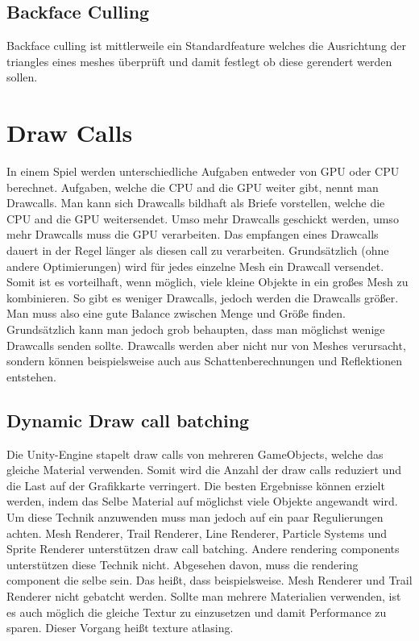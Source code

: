 \subsection{Backface Culling}
Backface culling ist mittlerweile ein Standardfeature welches die Ausrichtung der triangles eines meshes überprüft und damit festlegt ob diese gerendert werden sollen.
\cite{_cryengine_culling}

\section{Draw Calls}
In einem Spiel werden unterschiedliche Aufgaben entweder von GPU oder CPU berechnet.
Aufgaben, welche die CPU and die GPU weiter gibt, nennt man Drawcalls. Man kann sich Drawcalls bildhaft als Briefe vorstellen, welche die CPU and die GPU weitersendet. Umso mehr Drawcalls geschickt werden, umso mehr Drawcalls muss die GPU verarbeiten. Das empfangen eines Drawcalls dauert in der Regel länger als diesen call zu verarbeiten. Grundsätzlich (ohne andere Optimierungen) wird für jedes einzelne Mesh ein Drawcall versendet. Somit ist es vorteilhaft, wenn möglich, viele kleine Objekte in ein großes Mesh zu kombinieren. So gibt es weniger Drawcalls, jedoch werden die Drawcalls größer. Man muss also eine gute Balance zwischen Menge und Größe finden. Grundsätzlich kann man jedoch grob behaupten, dass man möglichst wenige Drawcalls senden sollte. Drawcalls werden aber nicht nur von Meshes verursacht, sondern können beispielsweise auch aus Schattenberechnungen und Reflektionen entstehen.

\subsection{Dynamic Draw call batching}
Die Unity-Engine stapelt draw calls von mehreren GameObjects, welche das gleiche Material verwenden. Somit wird die Anzahl der draw calls reduziert und die Last auf der Grafikkarte verringert. Die besten Ergebnisse können erzielt werden, indem das Selbe Material auf möglichst viele Objekte angewandt wird. Um diese Technik anzuwenden muss man jedoch auf ein paar Regulierungen achten. Mesh Renderer, Trail Renderer, Line Renderer, Particle Systems und Sprite Renderer unterstützen draw call batching. Andere rendering components unterstützen diese Technik nicht. Abgesehen davon, muss die rendering component die selbe sein. Das heißt, dass beispielsweise. Mesh Renderer und Trail Renderer nicht gebatcht werden. Sollte man mehrere Materialien verwenden, ist es auch möglich die gleiche Textur zu einzusetzen und damit Performance zu sparen. Dieser Vorgang heißt texture atlasing.

